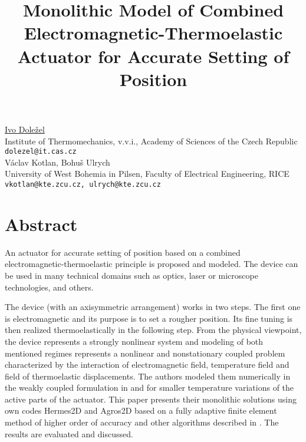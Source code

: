 \title{Monolithic Model of Combined Electromagnetic-Thermoelastic Actuator for Accurate Setting of Position}
\author{} \institute{}
\maketitle

\begin{center}
{\large \underline{Ivo Dole\v{z}el}}\\
Institute of Thermomechanics, v.v.i., Academy of Sciences of the Czech Republic\\
{\tt dolezel@it.cas.cz}
\vspace{4mm}\\

{\large V\'{a}clav Kotlan, Bohu\v{s} Ulrych}\\
University of West Bohemia in Pilsen, Faculty of Electrical Engineering, RICE\\
{\tt vkotlan@kte.zcu.cz, ulrych@kte.zcu.cz}\\
\end{center}

\section*{Abstract}
An actuator for accurate setting of position based on a combined electromagnetic-thermoelastic principle is proposed and modeled. The device can be used in many technical domains such as optics, laser or microscope technologies, and others.

The device (with an axisymmetric arrangement) works in two steps. The first one is electromagnetic and its purpose is to set a rougher position. Its fine tuning is then realized thermoelastically in the following step. From the physical viewpoint, the device represents a strongly nonlinear system and modeling of both mentioned regimes represents a nonlinear and nonstationary coupled problem characterized by the interaction of electromagnetic field, temperature field and field of thermoelastic displacements. The authors modeled them numerically in the weakly coupled formulation in \cite{dolezel1} and \cite{dolezel2} for smaller
temperature variations of the active parts of the actuator. This paper presents their monolithic solutions using own codes Hermes2D and Agros2D \cite{dolezel3} based on a fully adaptive finite element method of higher order of accuracy and other algorithms described in \cite{dolezel4}. The results are evaluated and discussed.

